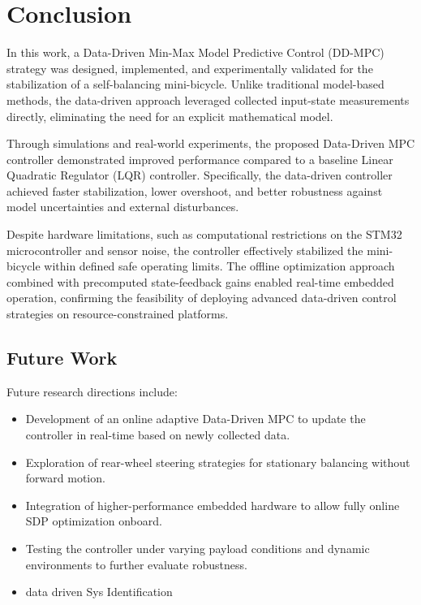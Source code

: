 \chapter{Conclusion}
\label{chap:conclusion}

In this work, a Data-Driven Min-Max Model Predictive Control (DD-MPC) strategy was designed, implemented, and experimentally validated for the stabilization of a self-balancing mini-bicycle.
Unlike traditional model-based methods, the data-driven approach leveraged collected input-state measurements directly, eliminating the need for an explicit mathematical model.

Through simulations and real-world experiments, the proposed Data-Driven MPC controller demonstrated improved performance compared to a baseline Linear Quadratic Regulator (LQR) controller.
Specifically, the data-driven controller achieved faster stabilization, lower overshoot, and better robustness against model uncertainties and external disturbances.

Despite hardware limitations, such as computational restrictions on the STM32 microcontroller and sensor noise, the controller effectively stabilized the mini-bicycle within defined safe operating limits.
The offline optimization approach combined with precomputed state-feedback gains enabled real-time embedded operation, confirming the feasibility of deploying advanced data-driven control strategies on resource-constrained platforms.

\section*{Future Work}

Future research directions include:
\begin{itemize}
	\item Development of an online adaptive Data-Driven MPC to update the controller in real-time based on newly collected data.
	\item Exploration of rear-wheel steering strategies for stationary balancing without forward motion.
	\item Integration of higher-performance embedded hardware to allow fully online SDP optimization onboard.
	\item Testing the controller under varying payload conditions and dynamic environments to further evaluate robustness.
	\item data driven Sys Identification
\end{itemize}

